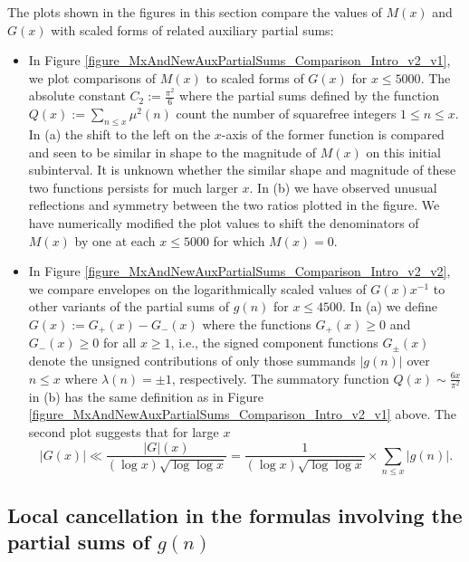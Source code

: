 \documentclass[11pt,reqno,a4letter]{article}
\newcommand{\hlocalref}[1]{\hyperref[#1]{\ref{#1}}}
\numberwithin{equation}{section}
\numberwithin{figure}{section}
\numberwithin{table}{section}
\theoremstyle{plain}
\numberwithin{theorem}{section}
\theoremstyle{definition}
\begin{document}
The plots shown in the figures in this section compare 
the values of $M(x)$ and $G(x)$ with scaled forms of related auxiliary partial sums: 
\begin{itemize}[noitemsep,topsep=0pt,leftmargin=0.23in]

\item In Figure \hlocalref{figure_MxAndNewAuxPartialSums_Comparison_Intro_v2_v1}, 
      we plot comparisons of $M(x)$ to scaled forms of $G(x)$ for $x \leq 5000$. The 
      absolute constant $C_2 := \frac{\pi^2}{6}$ where the partial sums defined by the function 
      $Q(x) := \sum_{n \leq x} \mu^2(n)$ count the number of squarefree integers $1 \leq n \leq x$. 
      In (a) the shift to the left on the $x$-axis of the former function 
      is compared and seen to be similar in shape to the magnitude of $M(x)$ on this initial subinterval. 
      It is unknown whether the similar shape and magnitude of these two functions persists for 
      much larger $x$. 
      In (b) we have observed unusual reflections and symmetry between the two ratios plotted in the 
      figure. We have numerically modified the plot values to shift the denominators of 
      $M(x)$ by one at each $x \leq 5000$ for which $M(x) = 0$. 

\item In Figure \hlocalref{figure_MxAndNewAuxPartialSums_Comparison_Intro_v2_v2}, we compare 
      envelopes on the logarithmically scaled values of $G(x) x^{-1}$ to other variants of 
      the partial sums of $g(n)$ for $x \leq 4500$. 
      In (a) we define $G(x) := G_{+}(x) - G_{-}(x)$ where the functions 
      $G_{+}(x) \geq 0$ and $G_{-}(x) \geq 0$ for all $x \geq 1$, 
      i.e., the signed component functions $G_{\pm}(x)$ 
      denote the unsigned contributions of only those summands 
      $|g(n)|$ over $n \leq x$ where $\lambda(n) = \pm 1$, respectively. 
      The summatory function $Q(x) \sim \frac{6x}{\pi^2}$ 
      in (b) has the same definition as in 
      Figure \hlocalref{figure_MxAndNewAuxPartialSums_Comparison_Intro_v2_v1} above. 
      The second plot suggests that for large $x$ 
      \[
      |G(x)| \ll \frac{|G|(x)}{(\log x) \sqrt{\log\log x}} = 
           \frac{1}{(\log x) \sqrt{\log\log x}} \times \sum_{n \leq x} |g(n)|.
      \]

\end{itemize}

\subsection{Local cancellation in 
	    the formulas involving the partial sums of $g(n)$} 
\label{subSection_LocalCancellationOfGInvx} 
\end{document}
